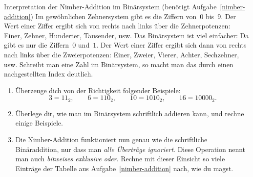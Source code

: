 \documentclass{../zirkelblatt}
\begin{document}
\begin{aufgabe}{Interpretation der Nimber-Addition im Binärsystem
(benötigt Aufgabe~\ref{nimber-addition})}
\label{nimber-addition-binaer}
Im gewöhnlichen Zehnersystem gibt es die Ziffern von~$0$ bis~$9$. Der Wert
einer Ziffer ergibt sich von rechts nach links über die Zehnerpotenzen: Einer,
Zehner, Hunderter, Tausender, usw. Das Binärsystem ist viel einfacher: Da gibt
es nur die Ziffern~$0$ und~$1$. Der Wert einer Ziffer ergibt sich dann von
rechts nach links über die Zweierpotenzen: Einer, Zweier, Vierer, Achter,
Sechzehner, usw. Schreibt man eine Zahl im Binärsystem, so macht man das durch
einen nachgestellten Index deutlich.
\begin{enumerate}
\item Überzeuge dich von der Richtigkeit folgender Beispiele:
\[ 3 = 11_2, \qquad
  6 = 110_2, \qquad
  10 = 1010_2, \qquad
  16 = 10000_2. \]
\item Überlege dir, wie man im Binärsystem schriftlich addieren kann, und
rechne einige Beispiele.
\item Die Nimber-Addition funktioniert nun genau wie die schriftliche
Binäraddition, nur dass man \emph{alle Überträge ignoriert}. Diese Operation
nennt man auch \emph{bitweises exklusive oder}. Rechne mit dieser
Einsicht so viele Einträge der Tabelle aus Aufgabe~\ref{nimber-addition} nach,
wie du magst.
\end{enumerate}
\end{aufgabe}
\end{document}

